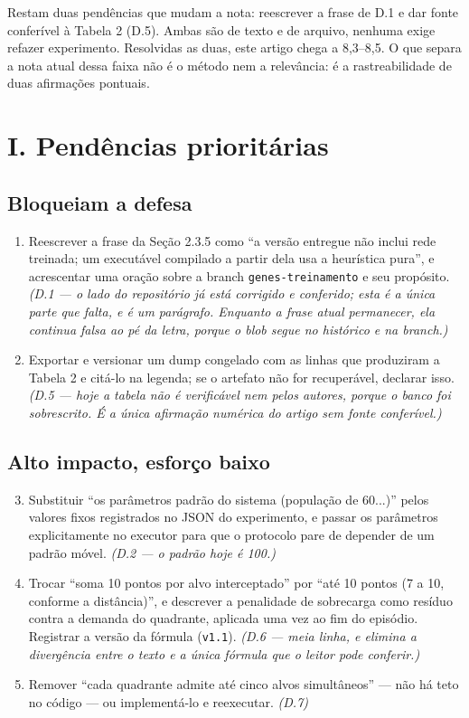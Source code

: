 \documentclass[11pt,a4paper]{article}
\begin{document}
Restam duas pendências que mudam a nota: reescrever a frase de D.1 e dar fonte conferível à Tabela 2
(D.5). Ambas são de texto e de arquivo, nenhuma exige refazer experimento. Resolvidas as duas, este
artigo chega a 8,3--8,5. O que separa a nota atual dessa faixa não é o método nem a relevância: é a
rastreabilidade de duas afirmações pontuais.

\section*{I. Pendências prioritárias}

\subsection*{Bloqueiam a defesa}

\begin{enumerate}
  \item Reescrever a frase da Seção 2.3.5 como ``a versão entregue não inclui rede treinada; um
  executável compilado a partir dela usa a heurística pura'', e acrescentar uma oração sobre a branch
  \texttt{genes-treinamento} e seu propósito. \emph{(D.1 --- o lado do repositório já está corrigido
  e conferido; esta é a única parte que falta, e é um parágrafo. Enquanto a frase atual permanecer,
  ela continua falsa ao pé da letra, porque o blob segue no histórico e na branch.)}

  \item Exportar e versionar um dump congelado com as linhas que produziram a Tabela 2 e citá-lo na
  legenda; se o artefato não for recuperável, declarar isso. \emph{(D.5 --- hoje a tabela não é
  verificável nem pelos autores, porque o banco foi sobrescrito. É a única afirmação numérica do
  artigo sem fonte conferível.)}
\end{enumerate}

\subsection*{Alto impacto, esforço baixo}

\begin{enumerate}\setcounter{enumi}{2}
  \item Substituir ``os parâmetros padrão do sistema (população de 60...)'' pelos valores fixos
  registrados no JSON do experimento, e passar os parâmetros explicitamente no executor para que o
  protocolo pare de depender de um padrão móvel. \emph{(D.2 --- o padrão hoje é 100.)}
  \item Trocar ``soma 10 pontos por alvo interceptado'' por ``até 10 pontos (7 a 10, conforme a
  distância)'', e descrever a penalidade de sobrecarga como resíduo contra a demanda do quadrante,
  aplicada uma vez ao fim do episódio. Registrar a versão da fórmula (\texttt{v1.1}).
  \emph{(D.6 --- meia linha, e elimina a divergência entre o texto e a única fórmula que o leitor
  pode conferir.)}
  \item Remover ``cada quadrante admite até cinco alvos simultâneos'' --- não há teto no código ---
  ou implementá-lo e reexecutar. \emph{(D.7)}
\end{enumerate}
\end{document}
